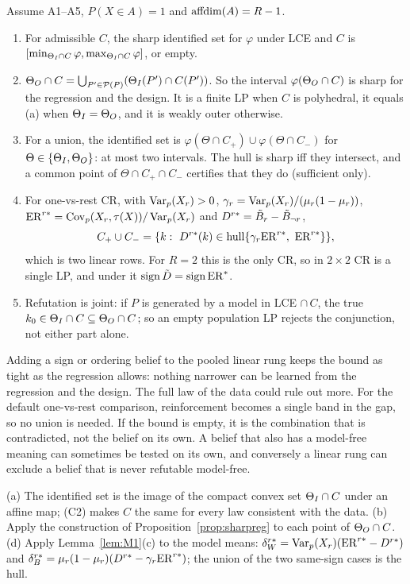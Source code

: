 \begin{theorem}\label{thm:R3}
Assume A1--A5, $P(X\in A)=1$ and $\operatorname{affdim}(A)=R-1$.
\begin{enumerate}[label=(\alph*)]
\item For admissible $C$, the sharp identified set for $\varphi$ under LCE and $C$
is $[\min_{\Theta_I\cap C}\varphi,\max_{\Theta_I\cap C}\varphi]$, or empty.
\item $\Theta_O\cap C=\bigcup_{P'\in\mathcal P(P)}(\Theta_I(P')\cap C(P'))$. So the
interval $\varphi(\Theta_O\cap C)$ is sharp for the regression and the design. It is a
finite LP when $C$ is polyhedral, it equals (a) when $\Theta_I=\Theta_O$, and it is weakly
outer otherwise.
\item For a union, the identified set is $\varphi(\Theta\cap C_+)\cup\varphi(\Theta\cap C_-)$
for $\Theta\in\{\Theta_I,\Theta_O\}$: at most two intervals. The hull is sharp iff they
intersect, and a common point of $\Theta\cap C_+\cap C_-$ certifies that they do
(sufficient only).
\item For one-vs-rest CR, with $\operatorname{Var}_p(X_r)>0$,
$\gamma_r=\operatorname{Var}_p(X_r)/(\mu_r(1-\mu_r))$, $\mathrm{ER}^{r*}=\operatorname{Cov}_p(X_r,\tau(X))/\operatorname{Var}_p(X_r)$ and
$D^{r*}=\tilde B_r-\tilde B_{\neg r}$,
\[
C_+\cup C_-=\{k:\ D^{r*}(k)\in\hull\{\gamma_r\ER^{r*},\ \ER^{r*}\}\},
\]
which is two linear rows. For $R=2$ this is the only CR, so in $2\times2$ CR is a
single LP, and under it $\operatorname{sign}\tilde D=\operatorname{sign}\mathrm{ER}^*$.
\item Refutation is joint: if $P$ is generated by a model in LCE $\cap\,C$, the
true $k_0\in\Theta_I\cap C\subseteq\Theta_O\cap C$; so an empty population LP rejects the
conjunction, not either part alone.
\end{enumerate}
\end{theorem}
\begin{reading}
Adding a sign or ordering belief to the pooled linear rung keeps the bound as
tight as the regression allows: nothing narrower can be learned from the
regression and the design. The full law of the data could rule out more. For the
default one-vs-rest comparison, reinforcement becomes a single band in the gap,
so no union is needed. If the bound is empty, it is the combination that is
contradicted, not the belief on its own. A belief that also has a model-free
meaning can sometimes be tested on its own, and conversely a linear rung can
exclude a belief that is never refutable model-free.
\end{reading}
\begin{sketch}
(a) The identified set is the image of the compact convex set $\Theta_I\cap C$ under an
affine map; (C2) makes $C$ the same for every law consistent with the data.
(b) Apply the construction of Proposition~\ref{prop:sharpreg} to each point of
$\Theta_O\cap C$. (d) Apply Lemma~\ref{lem:M1}(c) to the model means:
$\delta^{r*}_W=\operatorname{Var}_p(X_r)(\mathrm{ER}^{r*}-D^{r*})$ and
$\delta^{r*}_B=\mu_r(1-\mu_r)(D^{r*}-\gamma_r\mathrm{ER}^{r*})$; the union of the two
same-sign cases is the hull.
\end{sketch}

